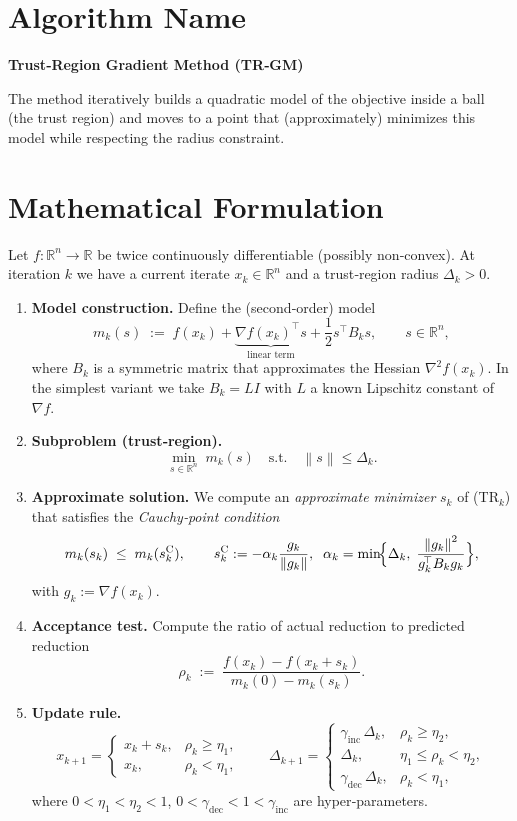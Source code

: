 \documentclass{article}
\newcommand{\R}{\mathbb{R}}
\newcommand{\norm}[1]{\left\lVert #1 \right\rVert}
\begin{document}
\section*{Algorithm Name}
\textbf{Trust‑Region Gradient Method (TR‑GM)}  

The method iteratively builds a quadratic model of the objective inside a ball (the trust region) and moves to a point that (approximately) minimizes this model while respecting the radius constraint.

\section*{Mathematical Formulation}
Let $f:\R^{n}\rightarrow\R$ be twice continuously differentiable (possibly non‑convex).  
At iteration $k$ we have a current iterate $x_k\in\R^{n}$ and a trust‑region radius $\Delta_k>0$.

\begin{enumerate}[label=\arabic*)]
\item \textbf{Model construction.}  
Define the (second‑order) model
\[
m_k(s)\;:=\;f(x_k)+\underbrace{\nabla f(x_k)^{\!\top}s}_{\text{linear term}}
          +\frac{1}{2}s^{\!\top}B_k s,
\qquad s\in\R^{n},
\]
where $B_k$ is a symmetric matrix that approximates the Hessian $\nabla^2 f(x_k)$.  
In the simplest variant we take $B_k = L I$ with $L$ a known Lipschitz constant of $\nabla f$.

\item \textbf{Subproblem (trust‑region).}  
\[
\min_{s\in\R^{n}}\; m_k(s)\quad\text{s.t.}\quad \norm{s}\le \Delta_k .
\tag{TR$_k$}
\]

\item \textbf{Approximate solution.}  
We compute an \emph{approximate minimizer} $s_k$ of (TR$_k$) that satisfies the \emph{Cauchy‑point condition}
\[
m_k(s_k)\;\le\; m_k(s^{\mathrm{C}}_k),\qquad 
s^{\mathrm{C}}_k := -\alpha_k \frac{g_k}{\norm{g_k}},\;\;
\alpha_k = \min\!\Bigl\{\Delta_k,\;\frac{\norm{g_k}^2}{g_k^{\!\top} B_k g_k}\Bigr\},
\]
with $g_k:=\nabla f(x_k)$.

\item \textbf{Acceptance test.}  
Compute the ratio of actual reduction to predicted reduction
\[
\rho_k \;:=\; \frac{f(x_k)-f(x_k+s_k)}{m_k(0)-m_k(s_k)} .
\]

\item \textbf{Update rule.}
\[
x_{k+1}= 
\begin{cases}
x_k+s_k, & \rho_k\ge \eta_1,\\[4pt]
x_k, & \rho_k<\eta_1,
\end{cases}
\qquad
\Delta_{k+1}= 
\begin{cases}
\gamma_{\text{inc}}\,\Delta_k, & \rho_k\ge \eta_2,\\[4pt]
\Delta_k, & \eta_1\le\rho_k<\eta_2,\\[4pt]
\gamma_{\text{dec}}\,\Delta_k, & \rho_k<\eta_1,
\end{cases}
\]
where $0<\eta_1<\eta_2<1$, $0<\gamma_{\text{dec}}<1<\gamma_{\text{inc}}$ are hyper‑parameters.

\end{enumerate}
\end{document}
